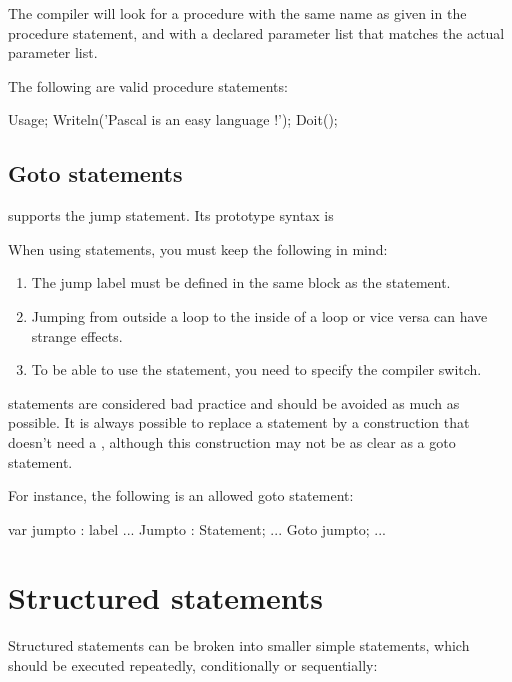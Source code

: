 \documentclass{report}
\begin{document}


The \fpc compiler will look for a procedure with the same name as given in
the procedure statement, and with a declared parameter list that matches the
actual parameter list.

The following are valid procedure statements:
\begin{listing}
Usage;
Writeln('Pascal is an easy language !');  
Doit();
\end{listing}

\subsection{Goto statements}

\fpc supports the  jump statement. Its prototype syntax is



When using  statements, you must keep the following in mind:
\begin{enumerate}
\item The jump label must be defined in the same block as the 
statement.
\item Jumping from outside a loop to the inside of a loop or vice versa can
 have strange effects.
\item To be able to use the  statement, you need to specify the 
 compiler switch.
\end{enumerate}
 statements are considered bad practice and should be avoided as
much as possible. It is always possible to replace a  statement by a
construction that doesn't need a , although this construction may 
not be as clear as a goto statement.

For instance, the following is an allowed goto statement:
\begin{listing}

var
  jumpto : label
...
Jumpto : 
  Statement;
...
Goto jumpto;
...
\end{listing}

\section{Structured statements}

Structured statements can be broken into smaller simple statements, which
should be executed repeatedly, conditionally  or sequentially:


\end{document}
